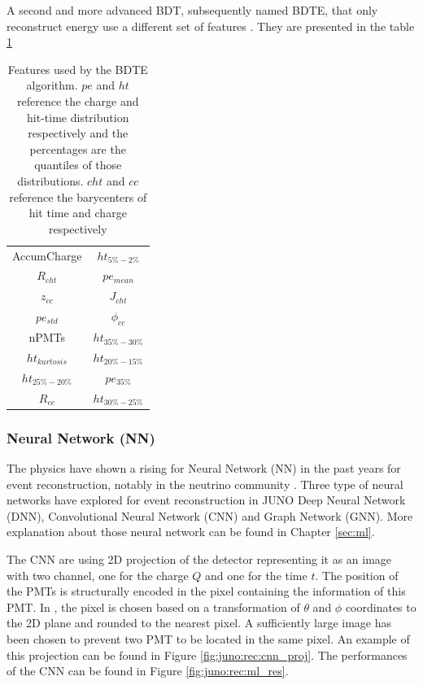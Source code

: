 \documentclass[../main.tex]{subfiles}
\begin{document}
A second and more advanced BDT, subsequently named BDTE, that only reconstruct energy use a different set of features \cite{gavrikov_energy_2022}. They are presented in the table \ref{tab:juno:rec:bdte}

\begin{table}
  \centering
  \begin{tabular}{|c|c|}
    \hline
    AccumCharge &  $ht_{5\%-2\%}$ \\
    $R_{cht}$ & $pe_{mean}$ \\
    $z_{cc}$ & $J_{cht}$ \\
    $pe_{std}$ & $\phi_{cc}$ \\
    nPMTs &  $ht_{35\%-30\%}$\\
    $ht_{kurtosis}$ & $ht_{20\%-15\%}$ \\
    $ht_{25\%-20\%}$ & $pe_{35\%}$ \\
    $R_{cc}$ & $ht_{30\%-25\%}$ \\
    \hline

  \end{tabular}
  \caption{Features used by the BDTE algorithm. $pe$ and $ht$ reference the charge and hit-time distribution respectively and the percentages are the quantiles of those distributions. $cht$ and $cc$ reference the barycenters of hit time and charge respectively}
  \label{tab:juno:rec:bdte}
\end{table}

\subsubsection{Neural Network (NN)}
The physics have shown a rising for Neural Network (NN) in the past years for event reconstruction, notably in the neutrino community \cite{abbasi_graph_2022, reck_graph_2021, collaboration_convolutional_2021, dune_collaboration_neutrino_2020}. Three type of neural networks have explored for event reconstruction in JUNO Deep Neural Network (DNN), Convolutional Neural Network (CNN) and Graph Network (GNN). More explanation about those neural network can be found in Chapter \ref{sec:ml}.

The CNN are using 2D projection of the detector representing it as an image with two channel, one for the charge $Q$ and one for the time $t$. The position of the PMTs is structurally encoded in the pixel containing the information of this PMT. In \cite{qian_vertex_2021}, the pixel is chosen based on a transformation of $\theta$ and $\phi$ coordinates to the 2D plane and rounded to the nearest pixel. A sufficiently large image has been chosen to prevent two PMT to be located in the same pixel. An example of this projection can be found in Figure \ref{fig:juno:rec:cnn_proj}. The performances of the CNN can be found in Figure \ref{fig:juno:rec:ml_res}.
\end{document}
